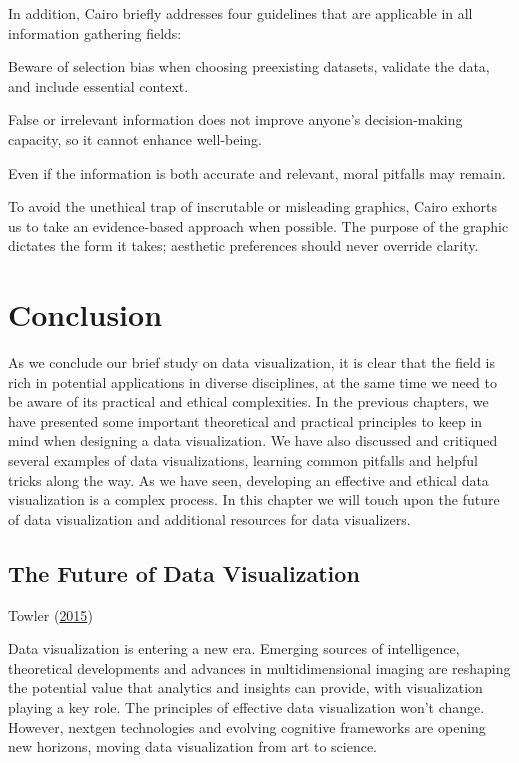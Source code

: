 \documentclass[]{book}
\begin{document}
In addition, Cairo briefly addresses four guidelines that are applicable in all information gathering fields:

Beware of selection bias when choosing preexisting datasets, validate the data, and include essential context.

False or irrelevant information does not improve anyone's decision-making capacity, so it cannot enhance well-being.

Even if the information is both accurate and relevant, moral pitfalls may remain.

To avoid the unethical trap of inscrutable or misleading graphics, Cairo exhorts us to take an evidence-based approach when possible. The purpose of the graphic dictates the form it takes; aesthetic preferences should never override clarity.

\hypertarget{conclusion}{%
\chapter{Conclusion}\label{conclusion}}

As we conclude our brief study on data visualization, it is clear that the field is rich in potential applications in diverse disciplines, at the same time we need to be aware of its practical and ethical complexities. In the previous chapters, we have presented some important theoretical and practical principles to keep in mind when designing a data visualization. We have also discussed and critiqued several examples of data visualizations, learning common pitfalls and helpful tricks along the way. As we have seen, developing an effective and ethical data visualization is a complex process. In this chapter we will touch upon the future of data visualization and additional resources for data visualizers.

\hypertarget{the-future-of-data-visualization}{%
\section{The Future of Data Visualization}\label{the-future-of-data-visualization}}

Towler (\protect\hyperlink{ref-future_viz}{2015})

Data visualization is entering a new era. Emerging sources of intelligence, theoretical developments and advances in multidimensional imaging are reshaping the potential value that analytics and insights can provide, with visualization playing a key role. The principles of effective data visualization won't change. However, nextgen technologies and evolving cognitive frameworks are opening new horizons, moving data visualization from art to science.
\end{document}
